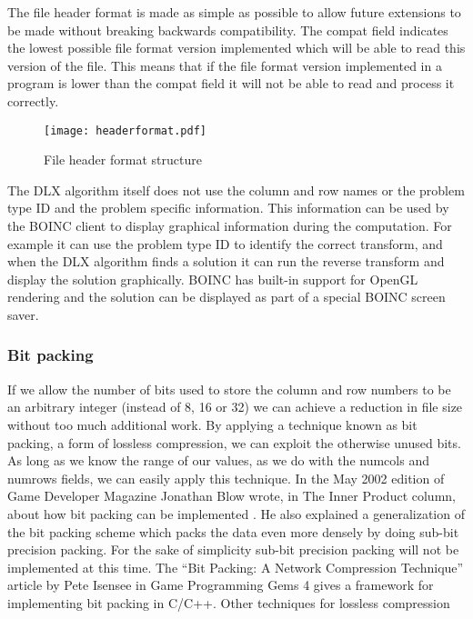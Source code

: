 The file header format is made as simple as possible to allow future extensions to be made without breaking backwards compatibility.
The compat field indicates the lowest possible file format version implemented which will be able to read this version of the file.
This means that if the file format version implemented in a program is lower than the compat field it will not be able to read and process it correctly.

\begin{figure}[htb]
	\centering
	\texttt{[image: headerformat.pdf]}
	\caption{File header format structure}
	\label{fig:header}
\end{figure}


The DLX algorithm itself does not use the column and row names or the problem type ID and the problem specific information.
This information can be used by the BOINC client to display graphical information during the computation.
For example it can use the problem type ID to identify the correct transform, and when the DLX algorithm finds a solution it can run the reverse transform and display the solution graphically.
BOINC has built-in support for OpenGL rendering and the solution can be displayed as part of a special BOINC screen saver.

\subsubsection{Bit packing}

If we allow the number of bits used to store the column and row numbers to be an arbitrary integer (instead of 8, 16 or 32) we can achieve a reduction in file size without too much additional work.
By applying a technique known as bit packing, a form of lossless compression, we can exploit the otherwise unused bits.
As long as we know the range of our values, as we do with the numcols and numrows fields, we can easily apply this technique.
In the May 2002 edition of Game Developer Magazine Jonathan Blow wrote, in The Inner Product column, about how bit packing can be implemented \cite{gdip_bitpack}.
He also explained a generalization of the bit packing scheme which packs the data even more densely by doing sub-bit precision packing.
For the sake of simplicity sub-bit precision packing will not be implemented at this time.
The ``Bit Packing: A Network Compression Technique'' article \cite{gpg_bitpack} by Pete Isensee in Game Programming Gems 4 gives a framework for implementing bit packing in C/C++.
Other techniques for lossless compression 

